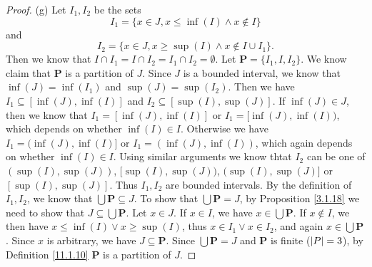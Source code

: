 \begin{proof}{(g)}
    Let \(I_1, I_2\) be the sets
    \[
        I_1 = \{x \in J, x \leq \inf(I) \land x \notin I\}
    \]
    and
    \[
        I_2 = \{x \in J, x \geq \sup(I) \land x \notin I \cup I_1\}.
    \]
    Then we know that \(I \cap I_1 = I \cap I_2 = I_1 \cap I_2 = \emptyset\).
    Let \(\mathbf{P} = \{I_1, I, I_2\}\).
    We know claim that \(\mathbf{P}\) is a partition of \(J\).
    Since \(J\) is a bounded interval, we know that \(\inf(J) = \inf(I_1)\) and \(\sup(J) = \sup(I_2)\).
    Then we have \(I_1 \subseteq [\inf(J), \inf(I)]\) and \(I_2 \subseteq [\sup(I), \sup(J)]\).
    If \(\inf(J) \in J\), then we know that \(I_1 = [\inf(J), \inf(I)]\) or \(I_1 = [\inf(J), \inf(I))\), which depends on whether \(\inf(I) \in I\).
    Otherwise we have \(I_1 = (\inf(J), \inf(I)]\) or \(I_1 = (\inf(J), \inf(I))\), which again depends on whether \(\inf(I) \in I\).
    Using similar arguments we know thtat \(I_2\) can be one of \((\sup(I), \sup(J))\), \([\sup(I), \sup(J))\), \((\sup(I), \sup(J)]\) or \([\sup(I), \sup(J)]\).
    Thus \(I_1, I_2\) are bounded intervals.
    By the definition of \(I_1, I_2\), we know that \(\bigcup \mathbf{P} \subseteq J\).
    To show that \(\bigcup \mathbf{P} = J\), by Proposition \ref{3.1.18} we need to show that \(J \subseteq \bigcup \mathbf{P}\).
    Let \(x \in J\).
    If \(x \in I\), we have \(x \in \bigcup \mathbf{P}\).
    If \(x \notin I\), we then have \(x \leq \inf(I) \lor x \geq \sup(I)\), thus \(x \in I_1 \lor x \in I_2\), and again \(x \in \bigcup \mathbf{P}\).
    Since \(x\) is arbitrary, we have \(J \subseteq \mathbf{P}\).
    Since \(\bigcup \mathbf{P} = J\) and \(\mathbf{P}\) is finite (\(\abs*{P} = 3\)), by Definition \ref{11.1.10} \(\mathbf{P}\) is a partition of \(J\).


\end{proof}
